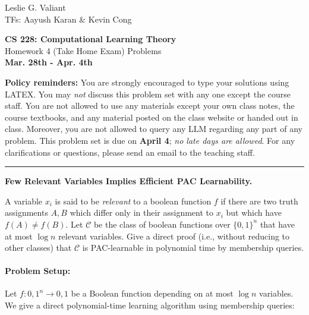 \documentclass[11pt]{article}
\DeclareMathOperator{\1}{\mathbbm{1}}
\begin{document}
\begin{flushright}
			Leslie G. Valiant \\
			TFs: Aayush Karan \& Kevin Cong
\end{flushright}

\begin{center}
\textbf{CS 228: Computational Learning Theory} \\
Homework 4 (Take Home Exam) Problems\\ \textbf{Mar. 28th - Apr. 4th}
\end{center}

\textbf{Policy reminders:} You are strongly encouraged to type your solutions using LATEX. You may \textit{not} discuss this problem set with any one except the course staff. You are not allowed to use any materials except your own class notes, the course textbooks, and any material posted on the class website or handed out in class. Moreover, you are not allowed to query any LLM regarding any part of any problem. This problem set is due on \textbf{April 4}; \textit{no late days are allowed}. For any clarifications or questions, please send an email to the teaching staff. 


\rule{\linewidth}{0.4pt}


\begin{problem} [10 pts] \textbf{Few Relevant Variables Implies Efficient PAC Learnability.}
    
A variable $x_i$ is said to be \textit{relevant} to a boolean function $f$ if there are two truth assignments $A, B$ which differ only in their assignment to $x_i$ but which have $f(A) \neq f(B)$. Let $\mathcal{C}$ be the class of boolean functions over $\{0,1\}^n$ that have at most $\log n$ relevant variables. Give a direct proof (i.e., without reducing to other classes) that $\mathcal{C}$ is PAC-learnable in polynomial time by membership queries. 


\end{problem}

\paragraph{Problem Setup:} Let $f:{0,1}^n \to {0,1}$ be a Boolean function depending on at most $\log n$ variables. We give a direct polynomial-time learning algorithm using membership queries:
\end{document}
